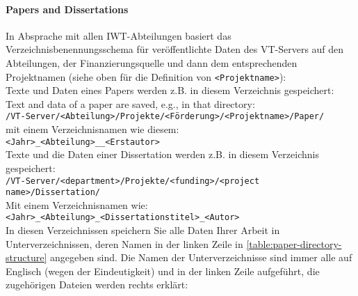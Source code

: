 \paragraph{Papers and Dissertations}

\noindent In Absprache mit allen IWT-Abteilungen basiert das
Verzeichnisbenennungsschema für veröffentlichte Daten des VT-Servers auf den
Abteilungen, der Finanzierungsquelle und dann dem entsprechenden Projektnamen
(siehe oben für die Definition von \texttt{<Projektname>}): \\
Texte und Daten eines Papers werden z.B. in diesem Verzeichnis gespeichert:
\\
Text and data of a paper are saved, e.g., in that directory:  \\
\texttt{/VT-Server/<Abteilung>/Projekte/<Förderung>/<Projektname>/Paper/} \\
mit einem Verzeichnisnamen wie diesem:
\\
\texttt{<Jahr>\_<Abteilung>\_<Paper-Name>\_<Erstautor> } \\
Texte und die Daten einer Dissertation werden z.B. in diesem Verzeichnis
gespeichert:
\\
\texttt{/VT-Server/<department>/Projekte/<funding>/<project name>/Dissertation/} \\
Mit einem Verzeichnisnamen wie:
\\
\texttt{<Jahr>\_<Abteilung>\_<Dissertationstitel>\_<Autor>} \\
In diesen Verzeichnissen speichern Sie alle Daten Ihrer Arbeit in
Unterverzeichnissen, deren Namen in der linken Zeile in
\autoref{table:paper-directory-structure} angegeben sind. Die Namen
der Unterverzeichnisse sind immer alle auf Englisch (wegen der Eindeutigkeit)
und in der linken Zeile aufgeführt, die zugehörigen Dateien werden rechts
erklärt:
\begin{table}[!h]
  \caption{%
  Die Daten jeder Arbeit müssen in acht Unterverzeichnissen gespeichert werden;
  weitere Hinweise: \\
  **Wenn die Arbeit druckreif ist, lädt der korrespondierende Autor die letzte
  und überarbeitete Version (d.h. nur die tatsächlich verwendeten, aber absolut
  vollständigen Daten) in das geschützte Verzeichnis \\
  ***Wenn die in einer Abbildung/Tabelle wiedergegebenen Daten aus verteilten
  Primärdatenverzeichnissen stammt, genügt es, hier nur das erzeugende Programm
  zu speichern%
  }

\label{table:paper-directory-structure}
\end{table}

